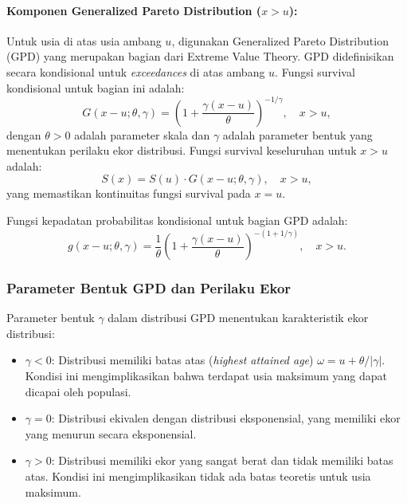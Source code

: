 \paragraph{Komponen Generalized Pareto Distribution ($x > u$):}
Untuk usia di atas usia ambang $u$, digunakan Generalized Pareto Distribution (GPD) yang merupakan bagian dari Extreme Value Theory. GPD didefinisikan secara kondisional untuk \textit{exceedances} di atas ambang $u$. Fungsi survival kondisional untuk bagian ini adalah:
\begin{equation}
G(x-u; \theta, \gamma) = \left(1 + \frac{\gamma(x-u)}{\theta}\right)^{-1/\gamma}, \quad x > u,
\label{eq:gpd_survival_conditional}
\end{equation}
dengan $\theta > 0$ adalah parameter skala dan $\gamma$ adalah parameter bentuk yang menentukan perilaku ekor distribusi. Fungsi survival keseluruhan untuk $x > u$ adalah:
\begin{equation}
S(x) = S(u) \cdot G(x-u; \theta, \gamma), \quad x > u,
\label{eq:tlt_gpd_survival}
\end{equation}
yang memastikan kontinuitas fungsi survival pada $x = u$.

Fungsi kepadatan probabilitas kondisional untuk bagian GPD adalah:
\begin{equation}
g(x-u; \theta, \gamma) = \frac{1}{\theta}\left(1 + \frac{\gamma(x-u)}{\theta}\right)^{-(1+1/\gamma)}, \quad x > u.
\label{eq:gpd_pdf_conditional}
\end{equation}

\subsubsection{Parameter Bentuk GPD dan Perilaku Ekor}

Parameter bentuk $\gamma$ dalam distribusi GPD menentukan karakteristik ekor distribusi:

\begin{itemize}
    \item \textbf{$\gamma < 0$}: Distribusi memiliki batas atas (\textit{highest attained age}) $\omega = u + \theta/|\gamma|$. Kondisi ini mengimplikasikan bahwa terdapat usia maksimum yang dapat dicapai oleh populasi.
    
    \item \textbf{$\gamma = 0$}: Distribusi ekivalen dengan distribusi eksponensial, yang memiliki ekor yang menurun secara eksponensial.
    
    \item \textbf{$\gamma > 0$}: Distribusi memiliki ekor yang sangat berat dan tidak memiliki batas atas. Kondisi ini mengimplikasikan tidak ada batas teoretis untuk usia maksimum.
\end{itemize}

